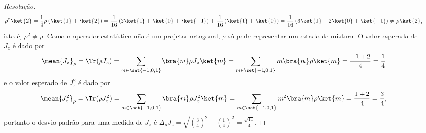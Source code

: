 \begin{proof}[Resolução]
   \begin{equation*}
      \rho^2\ket{2} = \frac14 \rho \left(\ket{1} + \ket{2}\right) = \frac{1}{16}\left(2 \ket{1} + \ket{0} + \ket{-1}\right) + \frac{1}{16}\left(\ket{1} + \ket{0}\right) = \frac{1}{16}\left(3\ket{1} + 2\ket{0} + \ket{-1}\right) \neq \rho \ket{2},
   \end{equation*}
   isto é, \(\rho^2 \neq \rho\). Como o operador estatístico não é um projetor ortogonal, \(\rho\) só pode representar um estado de mistura. O valor esperado de \(J_z\) é dado por
   \begin{equation*}
      \mean{J_z}_\rho = \Tr(\rho J_z) = \sum_{m \in \set{-1, 0, 1}} \bra{m}\rho J_z \ket{m} = \sum_{m \in \set{-1,0,1}} m \bra{m}\rho\ket{m} = \frac{-1 + 2}{4} = \frac{1}{4}
   \end{equation*}
   e o valor esperado de \(J_z^2\) é dado por
   \begin{equation*}
      \mean{J_z^2}_\rho = \Tr(\rho J_z^2) = \sum_{m \in \set{-1, 0, 1}} \bra{m}\rho J_z^2 \ket{m} = \sum_{m \in \set{-1,0,1}} m^2 \bra{m}\rho\ket{m} = \frac{1 + 2}{4} = \frac{3}{4},
   \end{equation*}
   portanto o desvio padrão para uma medida de \(J_z\) é \(\Delta_\rho{J_z} = \sqrt{\left(\frac{3}{4}\right)^2 - \left(\frac{1}{4}\right)^2} = \frac{\sqrt{11}}{4}.\)
\end{proof}
